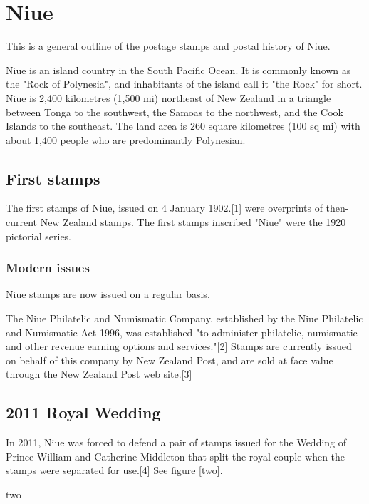 \chapter{Niue}  
This is a general outline of the postage stamps and postal history of Niue.

Niue is an island country in the South Pacific Ocean. It is commonly known as the "Rock of Polynesia", and inhabitants of the island call it "the Rock" for short. Niue is 2,400 kilometres (1,500 mi) northeast of New Zealand in a triangle between Tonga to the southwest, the Samoas to the northwest, and the Cook Islands to the southeast. The land area is 260 square kilometres (100 sq mi) with about 1,400 people who are predominantly Polynesian.


\section{First stamps}

The first stamps of Niue, issued on 4 January 1902.[1] were overprints of then-current New Zealand stamps. The first stamps inscribed "Niue" were the 1920 pictorial series.




\subsection{Modern issues}

Niue stamps are now issued on a regular basis.

The Niue Philatelic and Numismatic Company, established by the Niue Philatelic and Numismatic Act 1996, was established "to administer philatelic, numismatic and other revenue earning options and services."[2] Stamps are currently issued on behalf of this company by New Zealand Post, and are sold at face value through the New Zealand Post web site.[3] 

\section{2011 Royal Wedding}

In 2011, Niue was forced to defend a pair of stamps issued for the Wedding of Prince William and Catherine Middleton that split the royal couple when the stamps were separated for use.[4] See figure \ref{two}.

  {two}                  